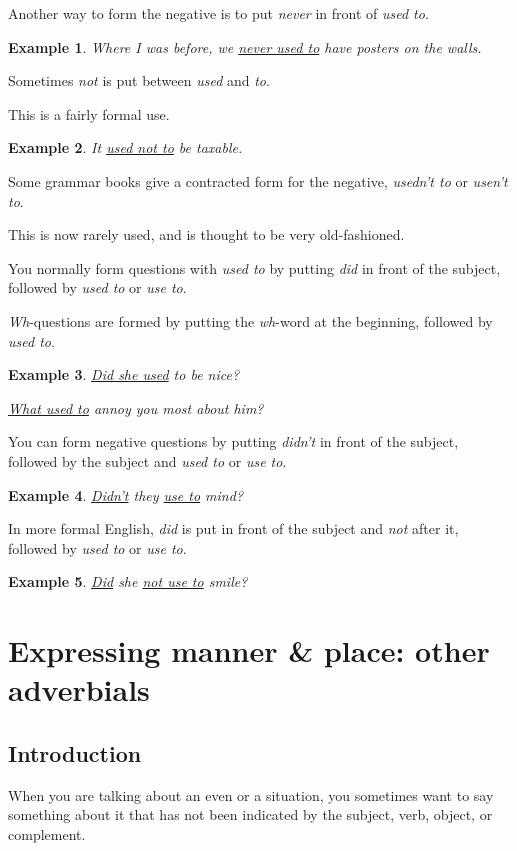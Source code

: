 \documentclass[oneside]{book}
\numberwithin{equation}{section}
\newtheorem{example}{Example}[section]
\begin{document}
%
Another way to form the negative is to put \textit{never} in front of \textit{used to}.
\begin{example}
    Where I was before, we \underline{never used to} have posters on the walls.
\end{example}
Sometimes \textit{not} is put between \textit{used} and \textit{to}.

This is a fairly formal use.
\begin{example}
    It \underline{used not to} be taxable.
\end{example}
Some grammar books give a contracted form for the negative, \textit{usedn't to} or \textit{usen't to}.

This is now rarely used, and is thought to be very old-fashioned.

%
\noindent{} You normally form questions with \textit{used to} by putting \textit{did} in front of the subject, followed by \textit{used to} or \textit{use to}.

\textit{Wh}-questions are formed by putting the \textit{wh}-word at the beginning, followed by \textit{used to}.
\begin{example}
    \underline{Did she used} to be nice?
    
    \underline{What used to} annoy you most about him?
\end{example}
You can form negative questions by putting \textit{didn't} in front of the subject, followed by the subject and \textit{used to} or \textit{use to}.
\begin{example}
    \underline{Didn't} they \underline{use to} mind?
\end{example}
In more formal English, \textit{did} is put in front of the subject and \textit{not} after it, followed by \textit{used to} or \textit{use to}.
\begin{example}
    \underline{Did} she \underline{not use to} smile?
\end{example}


\chapter{Expressing manner \& place: other adverbials}

\section{Introduction}
\noindent{} When you are talking about an even or a situation, you sometimes want to say something about it that has not been indicated by the subject, verb, object, or complement.
\end{document}
